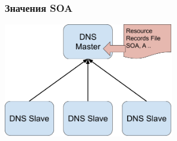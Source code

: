 \begin{frame}[fragile]
    \frametitle{Значения SOA}

\includegraphics[height=5cm]{../../slides/dns/masterslave.png}

\end{frame}